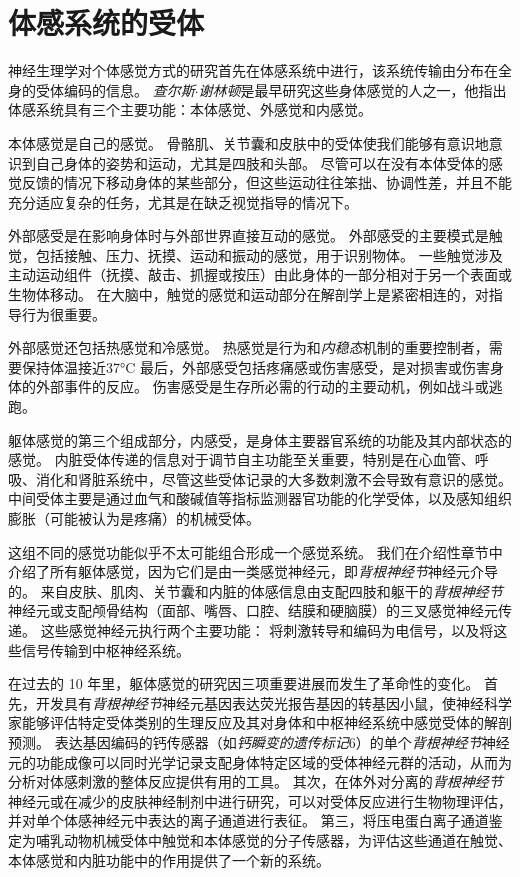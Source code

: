 \chapter{体感系统的受体} \label{chap:chap18}

神经生理学对个体感觉方式的研究首先在体感系统中进行，该系统传输由分布在全身的受体编码的信息。
\textit{查尔斯$\cdot$谢林顿}是最早研究这些身体感觉的人之一，他指出体感系统具有三个主要功能：本体感觉、外感觉和内感觉。


本体感觉是自己的感觉。
骨骼肌、关节囊和皮肤中的受体使我们能够有意识地意识到自己身体的姿势和运动，尤其是四肢和头部。
尽管可以在没有本体受体的感觉反馈的情况下移动身体的某些部分，但这些运动往往笨拙、协调性差，并且不能充分适应复杂的任务，尤其是在缺乏视觉指导的情况下。

外部感受是在影响身体时与外部世界直接互动的感觉。
外部感受的主要模式是触觉，包括接触、压力、抚摸、运动和振动的感觉，用于识别物体。
一些触觉涉及主动运动组件（抚摸、敲击、抓握或按压）由此身体的一部分相对于另一个表面或生物体移动。
在大脑中，触觉的感觉和运动部分在解剖学上是紧密相连的，对指导行为很重要。

外部感觉还包括热感觉和冷感觉。
热感觉是行为和\textit{内稳态}机制的重要控制者，需要保持体温接近37°C
最后，外部感受包括疼痛感或伤害感受，是对损害或伤害身体的外部事件的反应。
伤害感受是生存所必需的行动的主要动机，例如战斗或逃跑。


躯体感觉的第三个组成部分，内感受，是身体主要器官系统的功能及其内部状态的感觉。
内脏受体传递的信息对于调节自主功能至关重要，特别是在心血管、呼吸、消化和肾脏系统中，尽管这些受体记录的大多数刺激不会导致有意识的感觉。
中间受体主要是通过血气和酸碱值等指标监测器官功能的化学受体，以及感知组织膨胀（可能被认为是疼痛）的机械受体。


这组不同的感觉功能似乎不太可能组合形成一个感觉系统。
我们在介绍性章节中介绍了所有躯体感觉，因为它们是由一类感觉神经元，即\textit{背根神经节}神经元介导的。
来自皮肤、肌肉、关节囊和内脏的体感信息由支配四肢和躯干的\textit{背根神经节}神经元或支配颅骨结构（面部、嘴唇、口腔、结膜和硬脑膜）的三叉感觉神经元传递。
这些感觉神经元执行两个主要功能：
将刺激转导和编码为电信号，以及将这些信号传输到中枢神经系统。


在过去的 10 年里，躯体感觉的研究因三项重要进展而发生了革命性的变化。 
首先，开发具有\textit{背根神经节}神经元基因表达荧光报告基因的转基因小鼠，使神经科学家能够评估特定受体类别的生理反应及其对身体和中枢神经系统中感觉受体的解剖预测。
表达基因编码的钙传感器（如\textit{钙瞬变的遗传标记}6）的单个\textit{背根神经节}神经元的功能成像可以同时光学记录支配身体特定区域的受体神经元群的活动，从而为分析对体感刺激的整体反应提供有用的工具。
其次，在体外对分离的\textit{背根神经节}神经元或在减少的皮肤神经制剂中进行研究，可以对受体反应进行生物物理评估，并对单个体感神经元中表达的离子通道进行表征。
第三，将压电蛋白离子通道鉴定为哺乳动物机械受体中触觉和本体感觉的分子传感器，为评估这些通道在触觉、本体感觉和内脏功能中的作用提供了一个新的系统。


